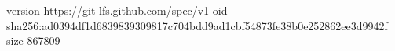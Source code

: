 version https://git-lfs.github.com/spec/v1
oid sha256:ad0394df1d6839839309817c704bdd9ad1cbf54873fe38b0e252862ee3d9942f
size 867809
